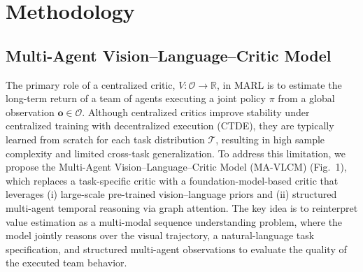 \documentclass[letterpaper, 10 pt, conference]{ieeeconf}  %
\begin{document}
\section{Methodology}
\label{section:VLCM}

\subsection{Multi-Agent Vision--Language--Critic Model}
The primary role of a centralized critic, $V:\mathcal{O}\rightarrow\mathbb{R}$, in MARL is to estimate the long-term return of a team of agents executing a joint policy $\pi$ from a global observation $\mathbf{o}\in\mathcal{O}$. Although centralized critics improve stability under centralized training with decentralized execution (CTDE), they are typically learned from scratch for each task distribution $\mathcal{T}$, resulting in high sample complexity and limited cross-task generalization. To address this limitation, we propose the Multi-Agent Vision--Language--Critic Model (MA-VLCM) (Fig.~1), which replaces a task-specific critic with a foundation-model-based critic that leverages (i) large-scale pre-trained vision--language priors and (ii) structured multi-agent temporal reasoning via graph attention. The key idea is to reinterpret value estimation as a multi-modal sequence understanding problem, where the model jointly reasons over the visual trajectory, a natural-language task specification, and structured multi-agent observations to evaluate the quality of the executed team behavior.
\end{document}
